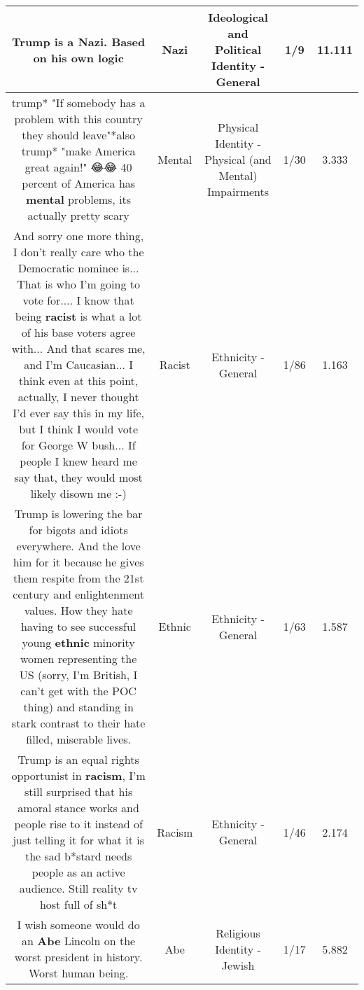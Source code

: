 \documentclass[11pt]{article}
\newlength\mylength
\begin{document}
\begin{center}
\begin{longtable}{|C{.65\mylength}|C{.30\mylength}|C{.12\mylength}|C{.12\mylength}|C{.12\mylength}|}
  \small Trump is a \textbf{Nazi}. Based on his own logic\normalsize   & Nazi &  Ideological and Political Identity - General & 1/9 & 11.111 \\  \hline
  \small *trump* "If somebody has a problem with this country they should leave"*also trump* "make America great again!" 😂😂 40 percent of America has \textbf{mental} problems, its actually pretty scary\normalsize   & Mental & Physical Identity - Physical (and Mental) Impairments & 1/30 & 3.333 \\  \hline
  \small And sorry one more thing, I don't really care who the Democratic nominee is... That is who I'm going to vote for.... I know that being \textbf{racist} is what a lot of his base voters agree with... And that scares me, and I'm Caucasian... I think even at this point, actually, I never thought I'd ever say this in my life, but I think I would vote for George W bush... If people I knew heard me say that, they would most likely disown me :-)\normalsize   & Racist & Ethnicity - General & 1/86 & 1.163 \\  \hline
  \small Trump is lowering the bar for bigots and idiots everywhere. And the love him for it because he gives them respite from the 21st century and enlightenment values. How they hate having to see successful young \textbf{ethnic} minority women representing the US (sorry, I'm British, I can't get with the POC thing) and standing in stark contrast to their hate filled, miserable lives.\normalsize   & Ethnic & Ethnicity - General & 1/63 & 1.587 \\  \hline
  \small Trump is an equal rights opportunist in \textbf{racism}, I'm still surprised that his amoral stance works and people rise to it instead of just telling it for what it is the sad b*stard needs people as an active audience. Still reality tv host full of sh*t\normalsize   & Racism & Ethnicity - General & 1/46 & 2.174 \\  \hline
  \small I wish someone would do an \textbf{Abe} Lincoln on the worst president in history. Worst human being.\normalsize   & Abe & Religious Identity - Jewish & 1/17 & 5.882 \\  \hline

\end{longtable}
\end{center}
\end{document}
